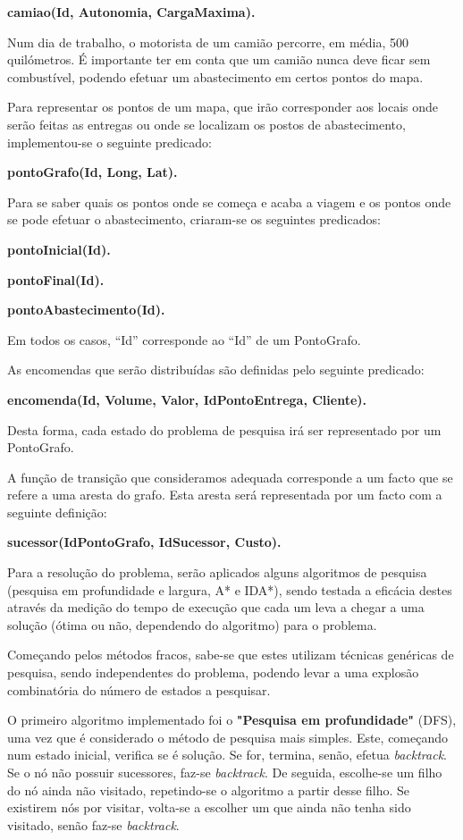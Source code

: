 \documentclass[a4paper]{article}
\begin{document}
\centerline{\textbf{camiao(Id, Autonomia, CargaMaxima).}}

Num dia de trabalho, o motorista de um camião percorre, em média, 500 quilómetros. É importante ter em conta que um camião nunca deve ficar sem combustível, podendo efetuar um abastecimento em certos pontos do mapa. 

Para representar os pontos de um mapa, que irão corresponder aos locais onde serão feitas as entregas ou onde se localizam os postos de abastecimento, implementou-se o seguinte predicado:

\centerline{\textbf{pontoGrafo(Id, Long, Lat).}}

Para se saber quais os pontos onde se começa e acaba a viagem e os pontos onde se pode efetuar o abastecimento, criaram-se os seguintes predicados:

\centerline{\textbf{pontoInicial(Id).}}

\centerline{\textbf{pontoFinal(Id).}}

\centerline{\textbf{pontoAbastecimento(Id).}}

Em todos os casos, “Id” corresponde ao “Id” de um PontoGrafo.

As encomendas que serão distribuídas são definidas pelo seguinte predicado:

\centerline{\textbf{encomenda(Id, Volume, Valor, IdPontoEntrega, Cliente).}}

Desta forma, cada estado do problema de pesquisa irá ser representado por um PontoGrafo.

A função de transição que consideramos adequada corresponde a um facto que se refere a uma aresta do grafo. Esta aresta será representada por um facto com a seguinte definição:

\centerline{\textbf{sucessor(IdPontoGrafo, IdSucessor, Custo).}}

Para a resolução do problema, serão aplicados alguns algoritmos de pesquisa (pesquisa em profundidade e largura, A* e IDA*), sendo testada a eficácia destes através da medição do tempo de execução que cada um leva a chegar a uma solução (ótima ou não, dependendo do algoritmo) para o problema.

Começando pelos métodos fracos, sabe-se que estes utilizam técnicas genéricas de pesquisa, sendo independentes do problema, podendo levar a uma explosão combinatória do número de estados a pesquisar.

O primeiro algoritmo implementado foi o \textbf{"Pesquisa em profundidade"} (DFS), uma vez que é considerado o método de pesquisa mais simples. Este, começando num estado inicial, verifica se é solução. Se for, termina, senão, efetua \textit{backtrack}. Se o nó não possuir sucessores, faz-se \textit{backtrack}. De seguida, escolhe-se um filho do nó ainda não visitado, repetindo-se o algoritmo a partir desse filho. Se existirem nós por visitar, volta-se a escolher um que ainda não tenha sido visitado, senão faz-se \textit{backtrack}.
\end{document}
